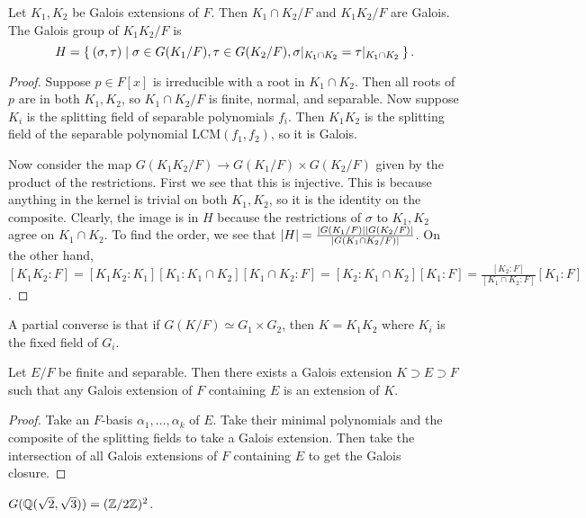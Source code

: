\message{ !name(notes.tex)}\documentclass[10pt, twoside]{article}
\begin{document}
        \begin{prop}
            Let $K_1, K_2$ be Galois extensions of $F$. Then $K_1 \cap K_2/F$ and $K_1K_2/F$ are Galois.
            The Galois group of $K_1K_2/F$ is \[H = \Set{(\sigma, \tau)| \sigma \in G(K_1/F), \tau \in G(K_2/F), \sigma|_{K_1\cap K_2} = \tau|_{K_1 \cap K_2}}.\]
            \begin{proof}
                Suppose $p \in F[x]$ is irreducible with a root in $K_1 \cap K_2$. Then all roots of $p$ are in both $K_1, K_2$, so $K_1 \cap K_2/F$ is finite, normal, and separable. Now suppose $K_i$ is the splitting field of separable polynomials $f_i$. Then $K_1K_2$ is the splitting field of the separable polynomial $\mathrm{LCM}(f_1, f_2)$, so it is Galois.

                Now consider the map $G(K_1K_2/F) \to G(K_1/F) \times G(K_2/F)$ given by the product of the restrictions. First we see that this is injective. This is because anything in the kernel is trivial on both $K_1, K_2$, so it is the identity on the composite. Clearly, the image is in $H$ because the restrictions of $\sigma$ to $K_1, K_2$ agree on $K_1 \cap K_2$. To find the order, we see that $\lvert H\rvert = \frac{\lvert G(K_1/F)\rvert\lvert G(K_2/F)\rvert}{\lvert G(K_1\cap K_2 / F)\rvert}$. On the other hand, $[K_1K_2:F] = [K_1K_2:K_1][K_1:K_1 \cap K_2][K_1 \cap K_2:F] = [K_2:K_1 \cap K_2][K_1:F] = \frac{[K_2:F]}{[K_1 \cap K_2:F]}[K_1:F]$.
            \end{proof}
        \end{prop}

        A partial converse is that if $G(K/F) \simeq G_1 \times G_2$, then $K = K_1K_2$ where $K_i$ is the fixed field of $G_i$.

        \begin{cor}
            Let $E/F$ be finite and separable. Then there exists a Galois extension $K \supset E \supset F$ such that any Galois extension of $F$ containing $E$ is an extension of $K$.
            \begin{proof}
                Take an $F$-basis $\alpha_1, \ldots, \alpha_k$ of $E$. Take their minimal polynomials and the composite of the splitting fields to take a Galois extension. Then take the intersection of all Galois extensions of $F$ containing $E$ to get the Galois closure.
            \end{proof}
        \end{cor}

        \begin{exm}
            $G(\mathbb{Q}(\sqrt{2}, \sqrt{3})) = (\mathbb{Z}/2\mathbb{Z})^2$.
        \end{exm}
\end{document}
